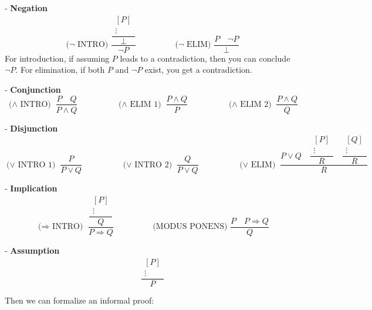 - \textbf{Negation} 
\[
  \text{(\(\neg\) INTRO) } \dfrac{\dfrac{\begin{array}{c}
      [P] \\
      \vdots
    \end{array}}{\bot}}{\neg P} \hspace{2cm} \text{(\(\neg\) ELIM) } \dfrac{P \quad \neg P}{\bot}  
\]
For introduction, if assuming \(P\) leads to a contradiction, then you can conclude \(\neg P\). For elimination, if both \(P\) and \(\neg P\) exist, you get a contradiction.

- \textbf{Conjunction} 
\[
  \text{(\(\wedge\) INTRO) } \dfrac{P \quad Q}{P \wedge Q} \hspace{2cm} \text{(\(\wedge\) ELIM 1) } \dfrac{P \wedge Q}{P} \hspace{2cm} \text{(\(\wedge\) ELIM 2) } \dfrac{P \wedge Q}{Q}
\]

- \textbf{Disjunction} 
\[
  \text{(\(\vee\) INTRO 1) } \dfrac{P}{P \vee Q} \hspace{2cm} \text{(\(\vee\) INTRO 2) } \dfrac{Q}{P \vee Q} \hspace{2cm} \text{(\(\vee\) ELIM) } \dfrac{P \vee Q \quad \dfrac{\begin{array}{c}
      [P] \\
      \vdots
    \end{array}}{R} \quad \dfrac{\begin{array}{c}
      [Q] \\
      \vdots
    \end{array}}{R}}{R}
\]

- \textbf{Implication} 
\[
  \text{(\(\Rightarrow\) INTRO) } \dfrac{\dfrac{\begin{array}{c}
      [P] \\
      \vdots
    \end{array}}{Q}}{P \Rightarrow Q} \hspace{2cm} \text{(MODUS PONENS) } \dfrac{P \quad P \Rightarrow Q}{Q}
\]

- \textbf{Assumption} 
\[
  \dfrac{\begin{array}{c}
    [P] \\
    \vdots
  \end{array}}{P}
\]

Then we can formalize an informal proof:

